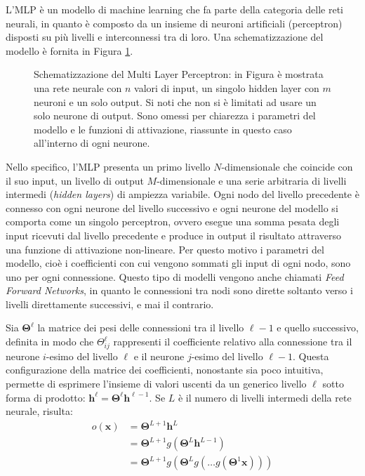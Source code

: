 L'MLP è un modello di machine learning che fa parte della categoria delle reti
neurali, in quanto è composto da un insieme di neuroni artificiali
(perceptron) disposti su più livelli e interconnessi tra di loro. Una
schematizzazione del modello è fornita in Figura \ref{fig:mlp}.
\begin{figure}[H]
  \caption{Schematizzazione del Multi Layer Perceptron: in Figura è mostrata
    una rete neurale con $n$ valori di input, un singolo hidden layer con $m$
    neuroni e un solo output. Si noti che non si è limitati ad usare un solo
    neurone di output. Sono omessi per chiarezza i parametri del modello e le
    funzioni di attivazione, riassunte in questo caso all'interno di ogni
    neurone.}
  \label{fig:mlp}
\end{figure}
Nello specifico, l'MLP presenta un primo livello $N$-dimensionale che coincide con il
suo input, un livello di output $M$-dimensionale e una serie arbitraria di
livelli intermedi (\emph{hidden layers}) di ampiezza variabile. Ogni nodo del
livello precedente è connesso con ogni neurone del livello successivo e ogni
neurone del modello si comporta come un singolo perceptron, ovvero esegue una
somma pesata degli input ricevuti dal livello precedente e produce in output il
risultato attraverso una funzione di attivazione non-lineare. Per questo motivo
i parametri del modello, cioè i coefficienti con cui vengono sommati gli input
di ogni nodo, sono uno per ogni connessione. Questo tipo di modelli vengono
anche chiamati \emph{Feed Forward Networks}, in quanto le connessioni tra nodi
sono dirette soltanto verso i livelli direttamente successivi, e mai il
contrario.

Sia $\bm \Theta^\ell$ la matrice dei pesi delle connessioni tra il livello
$\ell-1$ e quello successivo, definita in modo che $ \Theta^\ell_{ij} $
rappresenti il coefficiente relativo alla connessione tra il neurone $i$-esimo
del livello $\ell$ e il neurone $j$-esimo del livello $\ell-1$. Questa
configurazione della matrice dei coefficienti, nonostante sia poco intuitiva,
permette di esprimere l'insieme di valori uscenti da un generico livello $\ell$
sotto forma di prodotto: $ \bm h^\ell = \bm \Theta^\ell \bm h^{\ell-1}$. Se
$L$ è il numero di livelli intermedi della rete neurale, risulta:
\begin{align*}
  o(\bm x) &= \bm \Theta^{L+1} \bm h^L \\
  &= \bm \Theta^{L+1} g( \bm \Theta^L \bm h^{L-1}) \\
  &= \bm \Theta^{L+1} g(\bm \Theta^L g(\dots g(\bm \Theta^1 \bm x)))
\end{align*}
